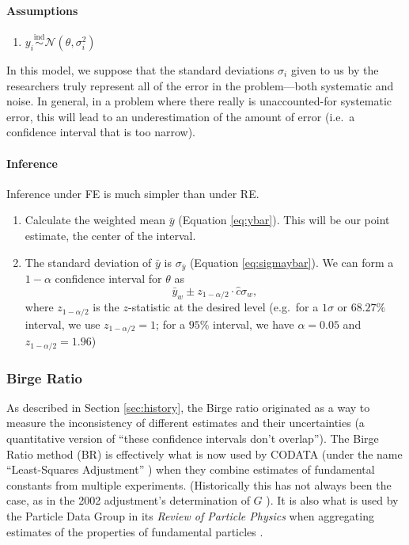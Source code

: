 \documentclass[letterpaper,12pt]{article}
\begin{document}
\paragraph{Assumptions}\label{assumptions-1}

\begin{enumerate}
\item
  $y_i\overset{\mathrm{ind}}{\sim}\mathcal{N}(\theta,\sigma_i^2)$
\end{enumerate}

In this model, we suppose that the standard deviations $\sigma_i$ given to us by the researchers truly represent all of the error in the problem---both systematic and noise. In general, in a problem where there really is unaccounted-for systematic error, this will lead to an underestimation of the amount of error (i.e.~a confidence interval that is too narrow).

\paragraph{Inference}\label{inference-1}

Inference under FE is much simpler than under RE.

\begin{enumerate}
\item
  Calculate the weighted mean $\bar{y}$ (Equation \ref{eq:ybar}). This will be our point estimate, the center of the interval.
\item
  The standard deviation of $\bar{y}$ is $\sigma_{\bar y}$ (Equation \ref{eq:sigmaybar}). We can form a $1-\alpha$ confidence interval for $\theta$ as \[\bar{y}_w\pm z_{1-{\alpha/2}}\cdot \hat c\sigma_w,\] where $z_{1-\alpha/2}$ is the $z$-statistic at the desired level (e.g.~for a $1\sigma$ or $68.27\%$ interval, we use $z_{1-\alpha/2}=1$; for a $95\%$ interval, we have $\alpha=0.05$ and $z_{1-\alpha/2}=1.96$)
\end{enumerate}

\subsubsection{Birge Ratio}\label{sec:birge}

As described in Section \ref{sec:history}, the Birge ratio originated as a way to measure the inconsistency of different estimates and their uncertainties (a quantitative version of ``these confidence intervals don't overlap''). The Birge Ratio method (BR) is effectively what is now used by CODATA (under the name ``Least-Squares Adjustment'' \citep{tiesinga2021codata}) when they combine estimates of fundamental constants from multiple experiments. (Historically this has not always been the case, as in the 2002 adjustment's determination of $G$ \citep{mohr2005codata}). It is also what is used by the Particle Data Group in its \emph{Review of Particle Physics} when aggregating estimates of the properties of fundamental particles \citep[Section 5.2.2]{navas2024review}.
\end{document}
